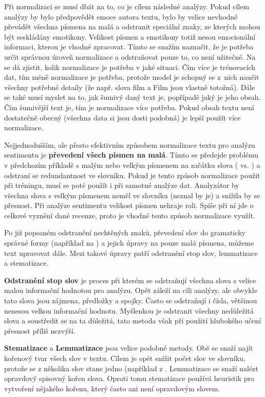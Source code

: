 Při normalizaci se musí dbát na to, co je cílem následné analýzy. Pokud cílem analýzy by bylo předpovědět emoce autora textu, bylo by velice nevhodné převádět všechna písmena na malá a odstranit speciální znaky, ze kterých mohou být seskládány emotikony. Velikost písmen a emotikony totiž nesou emocionální informaci, kterou je vhodné zpracovat. 
Tímto se snažím naznačit, že je potřeba určit správnou úroveň normalizace a odstraňovat pouze to, co není užitečné. Na \cite{mlexplained} se dá zjistit, kolik normalizace je potřeba v jaké situaci. Čím více je trénovacích dat, tím méně normalizace je potřeba, protože model je schopný se z~nich naučit všechny potřebné detaily (že např. slova film a Film jsou vlastně totožná). Dále se také musí myslet na to, jak šumivý daný text je, popřípadě jaký je jeho obsah. Čím šumivější text je, tím je normalizace více potřeba. Pokud obsah textu není dostatečně obecný (všechna data si jsou dosti podobná) je lepší použít více normalizace.

Nejjednodušším, ale přesto efektivním způsobem normalizace textu pro analýzu sentimentu je \textbf{převedení všech písmen na malá}. Tímto se předejde problému v předchozím příkladě s malým nebo velkým písmenem na začátku slova ( vs. ) a odstraní se redundantnost ve slovníku. Pokud je tento způsob normalizace použit při tréningu, musí se poté použít i při samotné analýze dat. Analyzátor by všechna slova s velkým písmenem neměl ve slovníku (neznal by je) a snížila by se přesnost.
Při analýze sentimentu velikost písmen nehraje roli. Spíše při ní jde o celkové vyznění dané recenze, proto je vhodné tento způsob normalizace využít.

Po již popsaném odstranění nechtěných znaků, převedení slov do gramaticky správné formy (například  na ) a jejich úpravy na pouze malá písmena, můžeme text upravovat dále. Mezi takové úpravy patří odstranění stop slov, lemmatizace a stematizace.


\textbf{Odstranění stop slov} je proces při kterém se odstraňují všechna slova s velice malou informační hodnotou pro analýzu. Opět záleží na cíli analýzy, ale obvykle tato slova jsou zájmena, předložky a spojky. Často se odstraňují i čísla, většinou nenesou velkou informační hodnotu. Myšlenkou je odstranit všechny nedůležitá slova a soustředit se na ta důležitá, tato metoda však při použití hlubokého učení přesnost příliš nezvýší.



\textbf{Stematizace} a \textbf{Lemmatizace} jsou velice podobné metody. Obě se snaží najít kořenový tvar všech slov v textu. Cílem je opět snížit počet slov ve slovníku, protože se z několika slov stane jedno (například z . Lemmatizace se snaží nalézt opravdový spisovný kořen slova. Oproti tomu stematizace používá heuristik pro vytvoření nějakého kořenu, který často ani není opravdovým slovem.





